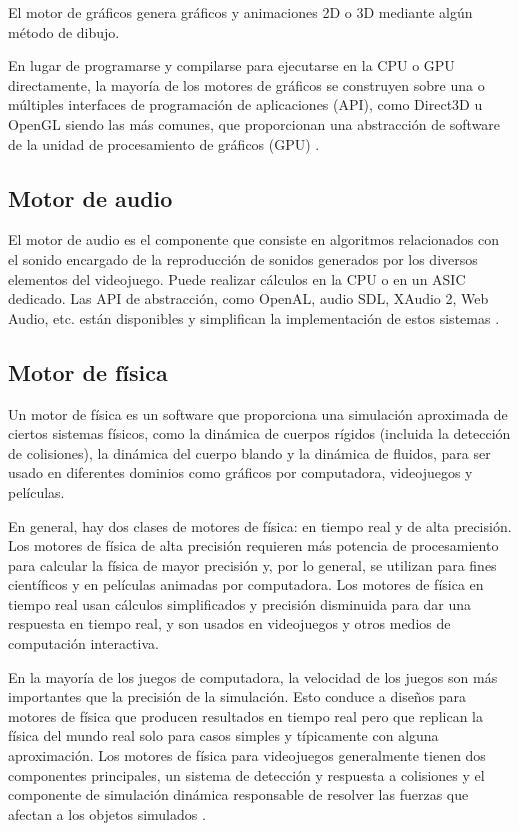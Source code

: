 El motor de gráficos genera gráficos y animaciones 2D o 3D mediante algún método de dibujo.

En lugar de programarse y compilarse para ejecutarse en la CPU o GPU directamente, la mayoría de los motores de gráficos se construyen sobre una o múltiples interfaces de programación de aplicaciones (API), como Direct3D u OpenGL siendo las más comunes, que proporcionan una abstracción de software de la unidad de procesamiento de gráficos (GPU) \cite{JasonGregory-GameEngineArchitecture}.

\subsection{Motor de audio}

El motor de audio es el componente que consiste en algoritmos relacionados con el sonido encargado de la reproducción de sonidos generados por los diversos elementos del videojuego. Puede realizar cálculos en la CPU o en un ASIC dedicado. Las API de abstracción, como OpenAL, audio SDL, XAudio 2, Web Audio, etc. están disponibles y simplifican la implementación de estos sistemas \cite{JasonGregory-GameEngineArchitecture}.

\subsection{Motor de física}

Un motor de física es un software que proporciona una simulación aproximada de ciertos sistemas físicos, como la dinámica de cuerpos rígidos (incluida la detección de colisiones), la dinámica del cuerpo blando y la dinámica de fluidos, para ser usado en diferentes dominios como gráficos por computadora, videojuegos y películas.

En general, hay dos clases de motores de física: en tiempo real y de alta precisión. Los motores de física de alta precisión requieren más potencia de procesamiento para calcular la física de mayor precisión y, por lo general, se utilizan para fines científicos y en películas animadas por computadora. Los motores de física en tiempo real usan cálculos simplificados y precisión disminuida para dar una respuesta en tiempo real, y son usados en videojuegos y otros medios de computación interactiva.

En la mayoría de los juegos de computadora, la velocidad de los juegos son más importantes que la precisión de la simulación. Esto conduce a diseños para motores de física que producen resultados en tiempo real pero que replican la física del mundo real solo para casos simples y típicamente con alguna aproximación. Los motores de física para videojuegos generalmente tienen dos componentes principales, un sistema de detección y respuesta a colisiones y el componente de simulación dinámica responsable de resolver las fuerzas que afectan a los objetos simulados \cite{JasonGregory-GameEngineArchitecture}.

